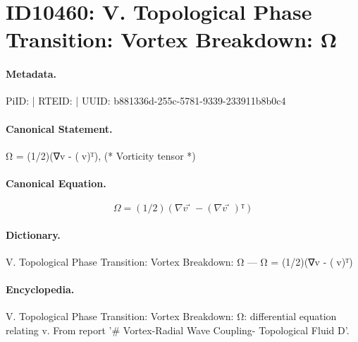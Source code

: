 \section*{ID10460: V. Topological Phase Transition: Vortex Breakdown: Ω}
\paragraph{Metadata.}
PiID:  | RTEID:  | UUID: b881336d-255c-5781-9339-233911b8b0c4

\paragraph{Canonical Statement.}
Ω = (1/2)(∇v⃗ - (∇v⃗)ᵀ), (* Vorticity tensor *)

\paragraph{Canonical Equation.}
\[
Ω = (1/2)(∇v⃗ - (∇v⃗)ᵀ)
\]

\paragraph{Dictionary.}
V. Topological Phase Transition: Vortex Breakdown: Ω — Ω = (1/2)(∇v⃗ - (∇v⃗)ᵀ)

\paragraph{Encyclopedia.}
V. Topological Phase Transition: Vortex Breakdown: Ω: differential equation relating v. From report '\# Vortex-Radial Wave Coupling- Topological Fluid D'.
